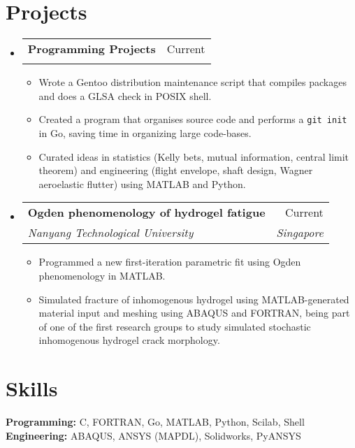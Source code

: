 \documentclass[letterpaper,11pt]{article}
\makeatletter
\newcommand{\resumeItem}[1]{
  \item{
    {#1 \vspace{-4pt}}
  }
}
\newcommand{\resumeSubheading}[4]{
  \vspace{-4pt}\item
    \begin{tabular*}{0.97\textwidth}[t]{l@{\extracolsep{\fill}}r}
      \textbf{#1} & #2 \\
      \textit{\small #3} & \textit{\small #4} \\
    \end{tabular*}\vspace{-10pt}
}
\newcommand{\resumeSubHeadingListStart}{\begin{itemize}[leftmargin=0.15in, label={}]}
\newcommand{\resumeSubHeadingListEnd}{\end{itemize}}
\newcommand{\resumeItemListStart}{\begin{itemize}}
\newcommand{\resumeItemListEnd}{\end{itemize}\vspace{-2pt}}
\makeatother
\begin{document}
\section{Projects}
\resumeSubHeadingListStart
  \resumeSubheading
  {Programming Projects}{Current}{}{}
  \resumeItemListStart
    \small
    \resumeItem{Wrote a Gentoo distribution maintenance script
    that compiles packages and does a GLSA check in POSIX shell.}
    \resumeItem{Created a program that organises
    source code and performs a \texttt{git init} in Go, 
    saving time in organizing large code-bases.}
    \resumeItem{Curated ideas in
    statistics (Kelly bets, mutual information, central limit theorem)
    and engineering
    (flight envelope, shaft design, Wagner aeroelastic flutter)
    using MATLAB and Python.}
    \resumeItemListEnd

    \resumeSubheading
      {Ogden phenomenology of hydrogel fatigue}{Current}{Nanyang Technological University}{Singapore}

      \resumeItemListStart
        \small
        \resumeItem{Programmed a new
        first-iteration parametric fit using Ogden phenomenology in MATLAB.}
        \resumeItem{Simulated fracture of inhomogenous
        hydrogel using MATLAB-generated material input and meshing using ABAQUS
        and FORTRAN, being part of one of the first research groups to study
        simulated stochastic inhomogenous hydrogel crack morphology.}
        \resumeItemListEnd
\resumeSubHeadingListEnd

\section{Skills}
\begin{itemize}[leftmargin=0.15in, label={}]
    \normalsize{\item{
     \textbf{Programming:}{ C, FORTRAN, Go, MATLAB, Python, Scilab, Shell} \\
     \textbf{Engineering:}{ ABAQUS, ANSYS (MAPDL), Solidworks, PyANSYS}\\
     }}
 \end{itemize}
\end{document}
